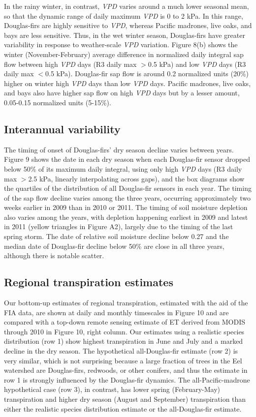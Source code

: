 In the rainy winter, in contrast, \textit{VPD} varies around a much lower seasonal mean, so that the dynamic range of daily maximum \textit{VPD} is 0 to 2 kPa.  In this range, Douglas-firs are highly sensitive to \textit{VPD}, whereas Pacific madrones, live oaks, and bays are less sensitive.  Thus, in the wet winter season, Douglas-firs have greater variability in response to weather-scale \textit{VPD} variation.  Figure 8(b) shows the winter (November-February) average difference in normalized daily integral sap flow between high \textit{VPD} days (R3 daily max $>$0.5 kPa) and low \textit{VPD} days (R3 daily max $<$0.5 kPa).  Douglas-fir sap flow is around 0.2 normalized units (20\%) higher on winter high \textit{VPD} days than low \textit{VPD} days.  Pacific madrones, live oaks, and bays also have higher sap flow on high \textit{VPD} days but by a lesser amount, 0.05-0.15 normalized units (5-15\%).

\subsection{Interannual variability}
The timing of onset of Douglas-firs' dry season decline varies between years.  Figure 9 shows the date in each dry season when each Douglas-fir sensor dropped below 50\% of its maximum daily integral, using only high \textit{VPD} days (R3 daily max $>$2.5 kPa, linearly interpolating across gaps), and the box diagrams show the quartiles of the distribution of all Douglas-fir sensors in each year.  The timing of the sap flow decline varies among the three years, occurring approximately two weeks earlier in 2009 than in 2010 or 2011.  The timing of soil moisture depletion also varies among the years, with depletion happening earliest in 2009 and latest in 2011 (yellow triangles in Figure A2), largely due to the timing of the last spring storm.  The date of relative soil moisture decline below 0.27 and the median date of Douglas-fir decline below 50\% are close in all three years, although there is notable scatter.

\subsection{Regional transpiration estimates}
Our bottom-up estimates of regional transpiration, estimated with the aid of the FIA data, are shown at daily and monthly timescales in Figure 10 and are compared with a top-down remote sensing estimate of ET derived from MODIS through 2010 in Figure 10, right column.  Our estimates using a realistic species distribution (row 1) show highest transpiration in June and July and a marked decline in the dry season.  The hypothetical all-Douglas-fir estimate (row 2) is very similar, which is not surprising because a large fraction of trees in the Eel watershed are Douglas-firs, redwoods, or other conifers, and thus the estimate in row 1 is strongly influenced by the Douglas-fir dynamics.  The all-Pacific-madrone hypothetical case (row 3), in contrast, has lower spring (February-May) transpiration and higher dry season (August and September) transpiration than either the realistic species distribution estimate or the all-Douglas-fir estimate.

